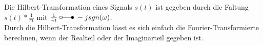 	Die Hilbert-Transformation eines Signals $s(t)$ ist gegeben durch die Faltung $s(t) * \frac{1}{\pi t}$ mit $\frac{1}{\pi t} \; \laplace \; -j sgn(\omega)$.\\
	Durch die Hilbert-Transformation lässt es sich einfach die Fourier-Transformierte berechnen, wenn der Realteil oder der Imaginärteil gegeben
	ist.
	